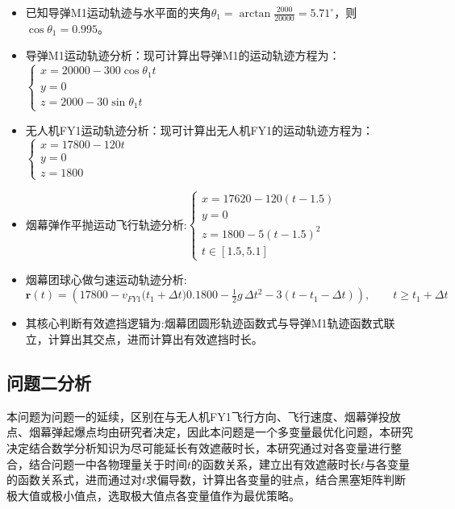 \documentclass{article}
\begin{document}
\begin{itemize}
    \item 已知导弹M1运动轨迹与水平面的夹角$\theta_1 = \arctan{\frac{2000}{20000}} = 5.71^\circ$，则$\cos\theta_1 = 0.995$。
    \item 导弹M1运动轨迹分析：现可计算出导弹M1的运动轨迹方程为：$\begin{cases}
        x = 20000 - 300 \cos\theta_1 t \\
        y = 0 \\
        z = 2000 - 30 \sin \theta_1t
    \end{cases}$
    \item 无人机FY1运动轨迹分析：现可计算出无人机FY1的运动轨迹方程为：$\begin{cases}
        x = 17800 - 120t \\
        y = 0 \\
        z = 1800 
    \end{cases}$
    \item 烟幕弹作平抛运动飞行轨迹分析:$\begin{cases}
        x = 17620 - 120(t - 1.5) \\
        y = 0 \\
        z = 1800  - 5(t - 1.5)^2 \\
        t \in [1.5,5.1]
    \end{cases}$
    \item 烟幕团球心做匀速运动轨迹分析:\[
\mathbf{r}(t)=\left(
17800 - v_{FY1}\big(t_1+ \Delta t)
0.1800 - \tfrac{1}{2}g\,\Delta t^{2} - 3(t - t_1 - \Delta t)
\right),
\qquad t \ge t_1 + \Delta t
\]
    \item 其核心判断有效遮挡逻辑为:烟幕团圆形轨迹函数式与导弹M1轨迹函数式联立，计算出其交点，进而计算出有效遮挡时长。
\end{itemize}

\subsection{问题二分析}
本问题为问题一的延续，区别在与无人机FY1飞行方向、飞行速度、烟幕弹投放点、烟幕弹起爆点均由研究者决定，因此本问题是一个多变量最优化问题，本研究决定结合数学分析知识为尽可能延长有效遮蔽时长，本研究通过对各变量进行整合，结合问题一中各物理量关于时间$t$的函数关系，建立出有效遮蔽时长$t$与各变量的函数关系式，进而通过对$t$求偏导数，计算出各变量的驻点，结合黑塞矩阵判断极大值或极小值点，选取极大值点各变量值作为最优策略。
\end{document}
